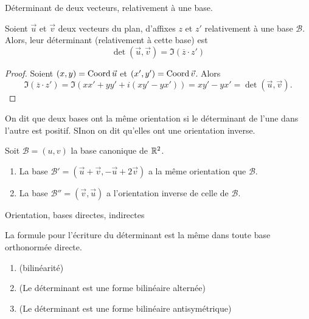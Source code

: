 \begin{definition}
Déterminant de deux vecteurs, relativement à une base.
\end{definition}

\begin{proposition}
Soient $\vec u$ et $\vec v$ deux vecteurs du plan, d'affixes $z$ et $z'$ relativement à une base $\mathcal B$. Alors, leur déterminant (relativement à cette base) est
\[ \det(\vec u, \vec v) = \Im(\overline z\cdot z')\]
\end{proposition}
\begin{proof}
Soient $(x,y)=\operatorname{Coord} \vec u$ et $(x',y')=\operatorname{Coord} \vec v$. Alors
\[ \Im(\overline z\cdot z') = \Im\left(xx'+yy'+i(xy'-yx')\right) = xy'-yx' = \det(\vec u, \vec v).\]
\end{proof}

\begin{definition}
On dit que deux bases ont la même orientation si le déterminant de l'une dans l'autre est positif. SInon on dit qu'elles ont une orientation inverse.
\end{definition}

\begin{exemples}Soit $\mathcal B = (u,v)$ la base canonique de $\mathbb{R}^2$.
\begin{enumerate}
\item La base $\mathcal B'=(\vec u+\vec v, -\vec u+2\vec v)$ a la même orientation que $\mathcal B$.
\item La base $\mathcal B''=(\vec v, \vec u)$ a l'orientation inverse de celle de $\mathcal B$.
\end{enumerate}
\end{exemples}

Orientation, bases directes, indirectes

\begin{proposition}
La formule pour l'écriture du déterminant est la même dans toute base orthonormée directe.
\end{proposition}

\begin{proposition}
\begin{enumerate}
\item (bilinéarité)
\item (Le déterminant est une forme bilinéaire alternée)
\item (Le déterminant est une forme bilinéaire antisymétrique)
\end{enumerate}
\end{proposition}


